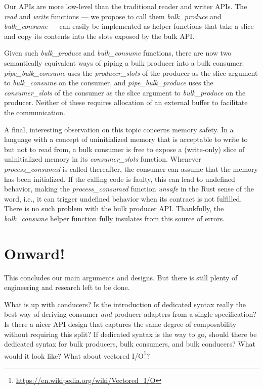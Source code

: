 \documentclass[sigplan,screen,10pt,review]{acmart}
\begin{document}
Our APIs are more low-level than the traditional reader and writer APIs. The \textit{read} and \textit{write} functions --- we propose to call them \textit{bulk\_produce} and \textit{bulk\_consume} --- can easily be implemented as helper functions that take a slice and copy its contents into the slots exposed by the bulk API.

Given such \textit{bulk\_produce} and \textit{bulk\_consume} functions, there are now two semantically equivalent ways of piping a bulk producer into a bulk consumer: \textit{pipe\_bulk\_consume} uses the \textit{producer\_slots} of the producer as the slice argument to \textit{bulk\_consume} on the consumer, and \textit{pipe\_bulk\_produce} uses the \textit{consumer\_slots} of the consumer as the slice argument to \textit{bulk\_produce} on the producer. Neither of these requires allocation of an external buffer to facilitate the communication.

A final, interesting observation on this topic concerns memory safety. In a language with a concept of uninitialized memory that is acceptable to write to but not to read from, a bulk consumer is free to expose a (write-only) slice of uninitialized memory in its \textit{consumer\_slots} function. Whenever \textit{process\_consumed} is called thereafter, the consumer can assume that the memory has been initialized. If the calling code is faulty, this can lead to undefined behavior, making the \textit{process\_consumed} function \textit{unsafe} in the Rust sense of the word, i.e., it can trigger undefined behavior when its contract is not fulfilled. There is no such problem with the bulk producer API. Thankfully, the \textit{bulk\_consume} helper function fully insulates from this source of errors.

\section{Onward!}\label{fun}

This concludes our main arguments and designs. But there is still plenty of engineering and research left to be done.

What is up with conducers? Is the introduction of dedicated syntax really the best way of deriving consumer \textit{and} producer adapters from a single specification? Is there a nicer API design that captures the same degree of composability without requiring this split? If dedicated syntax is the way to go, should there be dedicated syntax for bulk producers, bulk consumers, and bulk conducers? What would it look like? What about vectored I/O\footnote{\url{https://en.wikipedia.org/wiki/Vectored_I/O}}?
\end{document}
